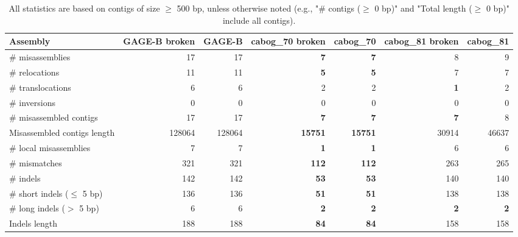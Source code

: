 \documentclass[12pt,a4paper]{article}
\begin{document}
\begin{table}[ht]
\begin{center}
\caption{All statistics are based on contigs of size $\geq$ 500 bp, unless otherwise noted (e.g., "\# contigs ($\geq$ 0 bp)" and "Total length ($\geq$ 0 bp)" include all contigs).}
\begin{tabular}{|l*{6}{|r}|}
\hline
Assembly & GAGE-B broken & GAGE-B & cabog\_70 broken & cabog\_70 & cabog\_81 broken & cabog\_81 \\ \hline
\# misassemblies & 17 & 17 & {\bf 7} & {\bf 7} & 8 & 9 \\ \hline
\hspace{5mm}\# relocations & 11 & 11 & {\bf 5} & {\bf 5} & 7 & 7 \\ \hline
\hspace{5mm}\# translocations & 6 & 6 & 2 & 2 & {\bf 1} & 2 \\ \hline
\hspace{5mm}\# inversions & 0 & 0 & 0 & 0 & 0 & 0 \\ \hline
\# misassembled contigs & 17 & 17 & {\bf 7} & {\bf 7} & {\bf 7} & 8 \\ \hline
Misassembled contigs length & 128064 & 128064 & {\bf 15751} & {\bf 15751} & 30914 & 46637 \\ \hline
\# local misassemblies & 7 & 7 & {\bf 1} & {\bf 1} & 6 & 6 \\ \hline
\# mismatches & 321 & 321 & {\bf 112} & {\bf 112} & 263 & 265 \\ \hline
\# indels & 142 & 142 & {\bf 53} & {\bf 53} & 140 & 140 \\ \hline
\hspace{5mm}\# short indels ($\leq$ 5 bp) & 136 & 136 & {\bf 51} & {\bf 51} & 138 & 138 \\ \hline
\hspace{5mm}\# long indels ($>$ 5 bp) & 6 & 6 & {\bf 2} & {\bf 2} & {\bf 2} & {\bf 2} \\ \hline
Indels length & 188 & 188 & {\bf 84} & {\bf 84} & 158 & 158 \\ \hline
\end{tabular}
\end{center}
\end{table}
\end{document}
